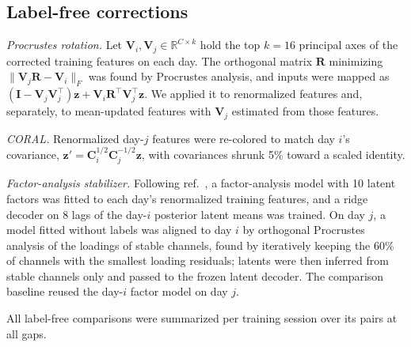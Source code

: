 \documentclass[pdflatex,sn-nature]{sn-jnl}
\begin{document}
\subsection*{Label-free corrections}

\textit{Procrustes rotation.} Let $\mathbf{V}_i, \mathbf{V}_j \in \mathbb{R}^{C\times k}$ hold the top $k = 16$ principal
axes of the corrected training features on each day. The orthogonal matrix $\mathbf{R}$ minimizing
$\|\mathbf{V}_j\mathbf{R} - \mathbf{V}_i\|_F$ was found by Procrustes analysis\cite{schonemann1966}, and inputs were mapped
as $(\mathbf{I} - \mathbf{V}_j\mathbf{V}_j^\top)\mathbf{z} + \mathbf{V}_i\mathbf{R}^\top\mathbf{V}_j^\top\mathbf{z}$. We
applied it to renormalized features and, separately, to mean-updated features with $\mathbf{V}_j$ estimated from those
features.

\textit{CORAL.} Renormalized day-$j$ features were re-colored to match day $i$'s covariance,
$\mathbf{z}' = \mathbf{C}_i^{1/2}\mathbf{C}_j^{-1/2}\mathbf{z}$\cite{sun2016}, with covariances shrunk 5\% toward a scaled
identity.

\textit{Factor-analysis stabilizer.} Following ref.~\cite{degenhart2020}, a factor-analysis model with 10 latent factors
was fitted to each day's renormalized training features, and a ridge decoder on 8 lags of the day-$i$ posterior latent
means was trained. On day $j$, a model fitted without labels was aligned to day $i$ by orthogonal Procrustes analysis of
the loadings of stable channels, found by iteratively keeping the 60\% of channels with the smallest loading residuals;
latents were then inferred from stable channels only and passed to the frozen latent decoder. The comparison baseline
reused the day-$i$ factor model on day $j$.

All label-free comparisons were summarized per training session over its pairs at all gaps.
\end{document}
